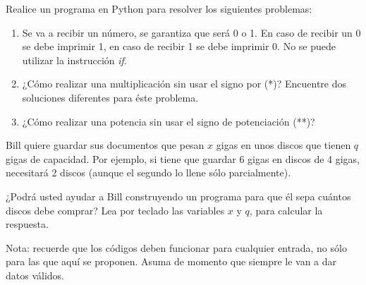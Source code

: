 \vfill

\begin{Exercise}[title={Calentamiento}]
Realice un programa en Python para resolver los siguientes problemas:
\begin{enumerate}
\item Se va a recibir un número, se garantiza que será 0 o 1. En caso de recibir un 0 se debe imprimir 1, en caso de recibir 1 se debe imprimir 0. No se puede utilizar la instrucción \emph{if}.

\item ¿Cómo realizar una multiplicación sin usar el signo por (*)? Encuentre dos soluciones diferentes para éste problema.

\item ¿Cómo realizar una potencia sin usar el signo de potenciación (**)?
\end{enumerate}
\end{Exercise}
\begin{Answer}


\newpage
\end{Answer}
\vfill
\begin{Exercise}[title={La Copia de Seguridad}]
Bill quiere guardar sus documentos que pesan $x$ gigas en unos discos que tienen $q$ gigas de capacidad. Por ejemplo, si tiene que guardar 6 gigas en discos de 4 gigas, necesitará 2 discos (aunque el segundo lo llene sólo parcialmente).

¿Podrá usted ayudar a Bill construyendo un programa para que él sepa cuántos discos debe comprar? Lea por teclado las variables $x$ y $q$, para calcular la respuesta.

Nota: recuerde que los códigos deben funcionar para cualquier entrada, no sólo para las que aquí se proponen. Asuma de momento que siempre le van a dar datos válidos.

\end{Exercise}

\newpage
\begin{Answer}
 
 
\end{Answer}

